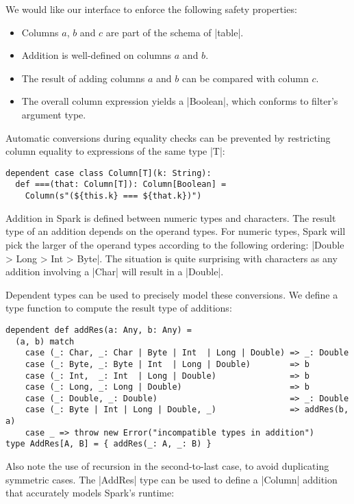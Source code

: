 We would like our interface to enforce the following safety properties:

\begin{itemize}
\item
  Columns $a$, $b$ and $c$ are part of the schema of
  |table|.
\item
  Addition is well-defined on columns $a$ and $b$.
\item
  The result of adding columns $a$ and $b$ can be compared with
  column $c$.
\item
  The overall column expression yields a |Boolean|, which
  conforms to filter's argument type.
\end{itemize}

Automatic conversions during equality checks can be prevented by restricting column equality to expressions of the same type |T|:

\begin{lstlisting}
dependent case class Column[T](k: String):
  def ===(that: Column[T]): Column[Boolean] =
    Column(s"(${this.k} === ${that.k})")
\end{lstlisting}

Addition in Spark is defined between numeric types and characters.
The result type of an addition depends on the operand types.
For numeric types, Spark will pick the larger of the operand types according to the following ordering: |Double > Long > Int > Byte|.
The situation is quite surprising with characters as any addition involving a |Char| will result in a |Double|.

Dependent types can be used to precisely model these conversions.
We define a type function to compute the result type of additions:

\begin{lstlisting}
dependent def addRes(a: Any, b: Any) =
  (a, b) match
    case (_: Char, _: Char | Byte | Int  | Long | Double) => _: Double
    case (_: Byte, _: Byte | Int  | Long | Double)        => b
    case (_: Int,  _: Int  | Long | Double)               => b
    case (_: Long, _: Long | Double)                      => b
    case (_: Double, _: Double)                           => _: Double
    case (_: Byte | Int | Long | Double, _)               => addRes(b, a)
    case _ => throw new Error("incompatible types in addition")
type AddRes[A, B] = { addRes(_: A, _: B) }
\end{lstlisting}

Also note the use of recursion in the second-to-last case, to avoid duplicating symmetric cases.
The |AddRes| type can be used to define a |Column| addition that accurately models Spark's runtime:

